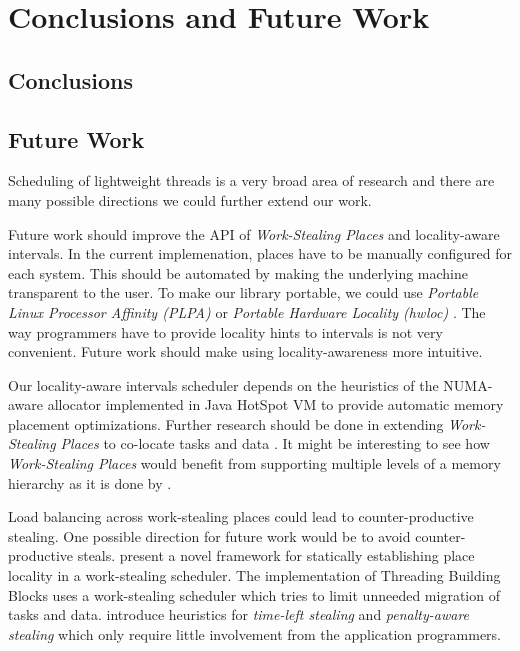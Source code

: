 
\chapter{Conclusions and Future Work}
\label{chap:locality-conclusions}

\section{Conclusions}
\label{sec:locality-conclusions-and-future-work-conclusions}



\section{Future Work}
\label{sec:locality-conclusions-and-future-work-future-work}

Scheduling of lightweight threads is a very broad area of research and
there are many possible directions we could further extend our work.

Future work should improve the API of \emph{Work-Stealing Places} and
locality-aware intervals. In the current implemenation, places have to
be manually configured for each system. This should be automated by
making the underlying machine transparent to the user. To make our
library portable, we could use \emph{Portable Linux Processor Affinity
  (PLPA)} \cite{OpenMPI2010a} or \emph{Portable Hardware Locality
  (hwloc)} \cite{OpenMPI2010}. The way programmers have to provide
locality hints to intervals is not very convenient. Future work should
make using locality-awareness more intuitive.

Our locality-aware intervals scheduler depends on the heuristics of
the NUMA-aware allocator implemented in Java HotSpot VM to provide
automatic memory placement optimizations. Further research should be
done in extending \emph{Work-Stealing Places} to co-locate tasks and
data \cite{HJ, Charles2005, Saraswat2010}. It might be interesting to
see how \emph{Work-Stealing Places} would benefit from supporting
multiple levels of a memory hierarchy as it is done by
\textcite{Yan2009}.

Load balancing across work-stealing places could lead to
counter-productive stealing. One possible direction for future work
would be to avoid counter-productive steals. \textcite{Agarwal2008}
present a novel framework for statically establishing place locality
in a work-stealing scheduler. The implementation of Threading Building
Blocks \cite{Contreras2008, Reinders2007} uses a work-stealing
scheduler which tries to limit unneeded migration of tasks and
data. \textcite{Gaud2010} introduce heuristics for \emph{time-left
  stealing} and \emph{penalty-aware stealing} which only require
little involvement from the application programmers.

